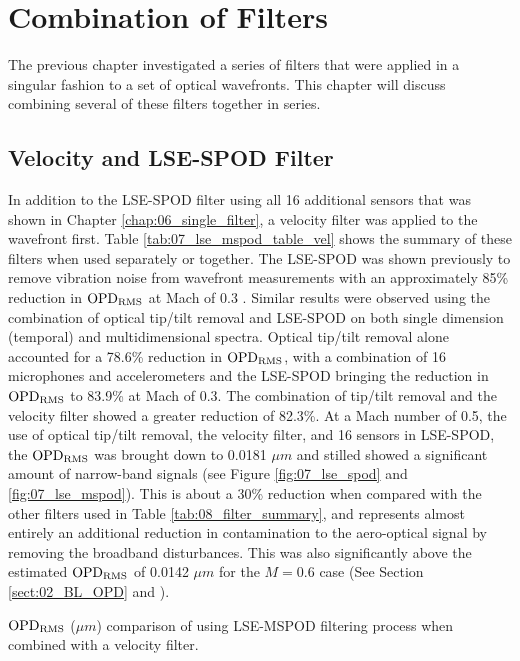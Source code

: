 
\chapter{Combination of Filters}
\label{chap:07_multiple_filter}

The previous chapter investigated a series of filters that were applied in a singular fashion to a set of optical wavefronts.
This chapter will discuss combining several of these filters together in series.


\section{Velocity and LSE-SPOD Filter}
In addition to the LSE-SPOD filter using all 16 additional sensors that was shown in Chapter \ref{chap:06_single_filter}, a velocity filter was applied to the wavefront first.
Table \ref{tab:07_lse_mspod_table_vel} shows the summary of these filters when used separately or together.
The LSE-SPOD was shown previously to remove vibration noise from wavefront measurements with an approximately 85\% reduction in $\operatorname{OPD_{RMS}}$ at Mach of 0.3 \cite{DeLucca-2014-RAJvGdv7}.
Similar results were observed using the combination of optical tip/tilt removal and LSE-SPOD on both single dimension (temporal) and multidimensional spectra.
Optical tip/tilt removal alone accounted for a 78.6\% reduction in $\operatorname{OPD_{RMS}}$, with a combination of 16 microphones and accelerometers and the LSE-SPOD bringing the reduction in $\operatorname{OPD_{RMS}}$ to 83.9\% at Mach of 0.3.
The combination of tip/tilt removal and the velocity filter showed a greater reduction of 82.3\%.
At a Mach number of 0.5, the use of optical tip/tilt removal, the velocity filter, and 16 sensors in LSE-SPOD, the $\operatorname{OPD_{RMS}}$ was brought down to 0.0181 $\mu m$ and stilled showed a significant amount of narrow-band signals (see Figure \ref{fig:07_lse_spod} and \ref{fig:07_lse_mspod}).
This is about a 30\% reduction when compared with the other filters used in Table \ref{tab:08_filter_summary}, and represents almost entirely an additional reduction in contamination to the aero-optical signal by removing the broadband disturbances.
This was also significantly above the estimated $\operatorname{OPD_{RMS}}$ of 0.0142 $\mu m$ for the $M=0.6$ case (See Section \ref{sect:02_BL_OPD} and \cite{Gordeyev-2014-jcJndkHM}).
\begin{table}
  \centering
  \caption{$\operatorname{OPD_{RMS}}$ ($\mu m$) comparison of using LSE-MSPOD filtering process when combined with a velocity filter.}
  
  \label{tab:07_lse_mspod_table_vel}
\end{table}

